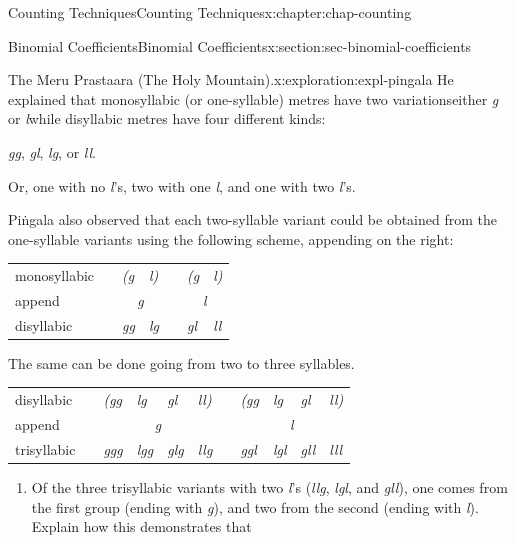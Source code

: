 \documentclass[oneside,10pt,]{book}
\newcommand{\tabularfont}{\relax}
\numberwithin{equation}{section}
\newcommand{\hrulemedium}{\noalign{\hrule height 0.07em}}
\begin{document}
\begin{chapterptx}{Counting Techniques}{}{Counting Techniques}{}{}{x:chapter:chap-counting}
\begin{sectionptx}{Binomial Coefficients}{}{Binomial Coefficients}{}{}{x:section:sec-binomial-coefficients}
\begin{exploration}{The Meru Prastaara (The Holy Mountain).}{x:exploration:expl-pingala}
He explained that monosyllabic (or one-syllable) metres have two variations\textemdash{}either \emph{g} or \emph{l}\textemdash{}while disyllabic metres have four different kinds:%
\begin{sidebyside}{1}{0.35}{0.35}{0}%
\begin{sbspanel}{0.3}%
\emph{gg}, \emph{gl}, \emph{lg}, or \emph{ll}.%
\end{sbspanel}%
\end{sidebyside}%
\par
Or, one with no \emph{l}'s, two with one \emph{l}, and one with two \emph{l}'s.%
\par
Piṅgala also observed that each two-syllable variant could be obtained from the one-syllable variants using the following scheme, appending on the right:%
\begin{sidebyside}{1}{0.15}{0.15}{0}%
\begin{sbspanel}{0.7}%
{\centering%
{\tabularfont%
\begin{tabular}{lllllll}
monosyllabic&&\emph{(g}&\emph{l)}&&\emph{(g}&\emph{l)}\tabularnewline[0pt]
append&&\multicolumn{2}{c}{\emph{g}}&&\multicolumn{2}{c}{\emph{l}}\tabularnewline\hrulemedium
disyllabic&&\emph{gg}&\emph{lg}&&\emph{gl}&\emph{ll}
\end{tabular}
}%
\par}
\end{sbspanel}%
\end{sidebyside}%
\par
The same can be done going from two to three syllables.%
\begin{sidebyside}{1}{0.15}{0.15}{0}%
\begin{sbspanel}{0.7}%
{\centering%
{\tabularfont%
\begin{tabular}{lllllllllll}
disyllabic&&\emph{(gg}&\emph{lg}&\emph{gl}&\emph{ll)}&&\emph{(gg}&\emph{lg}&\emph{gl}&\emph{ll)}\tabularnewline[0pt]
append&&\multicolumn{4}{c}{\emph{g}}&&\multicolumn{4}{c}{\emph{l}}\tabularnewline\hrulemedium
trisyllabic&&\emph{ggg}&\emph{lgg}&\emph{glg}&\emph{llg}&&\emph{ggl}&\emph{lgl}&\emph{gll}&\emph{lll}
\end{tabular}
}%
\par}
\end{sbspanel}%
\end{sidebyside}%
\begin{enumerate}[font=\bfseries,label=(\alph*),ref=\alph*]
\item{}Of the three trisyllabic variants with two \emph{l}'s (\emph{llg}, \emph{lgl}, and \emph{gll}), one comes from the first group (ending with \emph{g}), and two from the second (ending with \emph{l}). Explain how this demonstrates that%

\end{enumerate}
\end{exploration}
\end{sectionptx}
\end{chapterptx}
\end{document}
